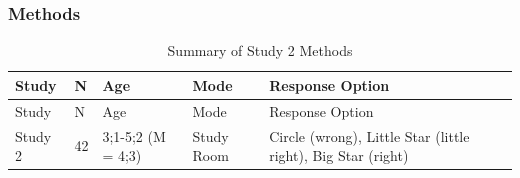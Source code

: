 \documentclass[man]{apa6}
\theoremstyle{definition}
\theoremstyle{definition}
\theoremstyle{definition}
\theoremstyle{remark}
\begin{document}
\subsubsection{Methods}\label{methods-1}

\begin{longtable}[]{@{}lllll@{}}
\caption{\label{tab:study2info} Summary of Study 2 Methods}\tabularnewline
\toprule
\begin{minipage}[b]{0.08\columnwidth}\raggedright\strut
Study\strut
\end{minipage} & \begin{minipage}[b]{0.04\columnwidth}\raggedright\strut
N\strut
\end{minipage} & \begin{minipage}[b]{0.21\columnwidth}\raggedright\strut
Age\strut
\end{minipage} & \begin{minipage}[b]{0.17\columnwidth}\raggedright\strut
Mode\strut
\end{minipage} & \begin{minipage}[b]{0.32\columnwidth}\raggedright\strut
Response Option\strut
\end{minipage}\tabularnewline
\midrule
\endfirsthead
\toprule
\begin{minipage}[b]{0.08\columnwidth}\raggedright\strut
Study\strut
\end{minipage} & \begin{minipage}[b]{0.04\columnwidth}\raggedright\strut
N\strut
\end{minipage} & \begin{minipage}[b]{0.21\columnwidth}\raggedright\strut
Age\strut
\end{minipage} & \begin{minipage}[b]{0.17\columnwidth}\raggedright\strut
Mode\strut
\end{minipage} & \begin{minipage}[b]{0.32\columnwidth}\raggedright\strut
Response Option\strut
\end{minipage}\tabularnewline
\midrule
\endhead
\begin{minipage}[t]{0.08\columnwidth}\raggedright\strut
Study 2\strut
\end{minipage} & \begin{minipage}[t]{0.04\columnwidth}\raggedright\strut
42\strut
\end{minipage} & \begin{minipage}[t]{0.21\columnwidth}\raggedright\strut
3;1-5;2 (M = 4;3)\strut
\end{minipage} & \begin{minipage}[t]{0.17\columnwidth}\raggedright\strut
Study Room\strut
\end{minipage} & \begin{minipage}[t]{0.32\columnwidth}\raggedright\strut
Circle (wrong), Little Star (little right), Big Star (right)\strut
\end{minipage}\tabularnewline
\bottomrule
\end{longtable}
\end{document}
